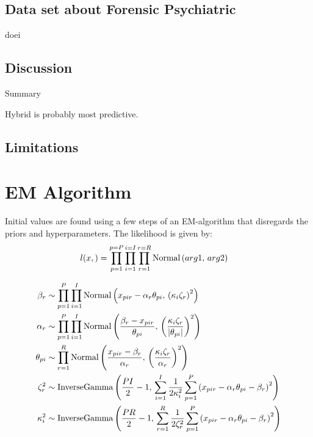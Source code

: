\documentclass[a4paper,11pt]{article}
\begin{document}
\subsection{Data set about Forensic Psychiatric}
doei
\subsection{Discussion}
Summary

Hybrid is probably most predictive.

\subsection{Limitations}

\printbibliography

\appendix
\section{EM Algorithm}

Initial values are found using a few steps of an EM-algorithm that disregards the priors and hyperparameters.
The likelihood is given by:
\begin{align*}
	l(x, ) &=
	\prod_{\Ipatient=1}^{\Ipatient=\Tpatient}
	\prod_{\Iitem=1}^{\Iitem=\Titem}
	\prod_{\Irater=1}^{\Irater=\Trater}
	\dnorm{arg1}{arg2}
\end{align*}

\begin{align*}
	\RaterShift_\Irater &\sim \prod_{\Ipatient=1}^\Tpatient\prod_{\Iitem=1}^\Titem \dnorm{x_{pir} - \RaterScale_\Irater\ItemTruth_{\Ipatient\Iitem}}{\left(\ItemDifficulty_\Iitem\RaterCompetence_\Irater\right)^2} \\
	\RaterScale_\Irater &\sim \prod_{\Ipatient=1}^\Tpatient\prod_{\Iitem=1}^\Titem 
	\dnorm{\frac{
			\RaterShift_\Irater - x_{pir}
		}{
			\ItemTruth_{\Ipatient\Iitem}
		}}{
		\left(\frac{
			\ItemDifficulty_\Iitem\RaterCompetence_\Irater
		}{
			\left|\ItemTruth_{\Ipatient\Iitem}\right|}\right)^2
		} \\
	\ItemTruth_{\Ipatient\Iitem} &\sim \prod_{\Irater=1}^\Trater
	\dnorm{\frac{
			x_{pir} - \RaterShift_\Irater
		}{
			\RaterScale_\Irater
		}}{
		\left(\frac{
			\ItemDifficulty_\Iitem\RaterCompetence_\Irater
		}{
			\RaterScale_\Irater}\right)^2
	} \\
	\RaterCompetence_\Irater^2 &\sim \dinvgamma{\frac{\Tpatient\Titem}{2}-1}{
		\sum_{\Iitem=1}^\Titem \frac{1}{2\ItemDifficulty_\Iitem^{2}}\sum_{\Ipatient=1}^\Tpatient
		\left(x_{pir} - \RaterScale_\Irater\ItemTruth_{\Ipatient\Iitem} - \RaterShift_\Irater\right)^2
	}\\
	\ItemDifficulty_\Iitem^2 &\sim \dinvgamma{\frac{\Tpatient\Trater}{2}-1}{
		\sum_{\Irater=1}^\Trater \frac{1}{2\RaterCompetence_\Irater^{2}}\sum_{\Ipatient=1}^\Tpatient
		\left(x_{pir} - \RaterScale_\Irater\ItemTruth_{\Ipatient\Iitem} - \RaterShift_\Irater\right)^2
	}
\end{align*}
\end{document}
